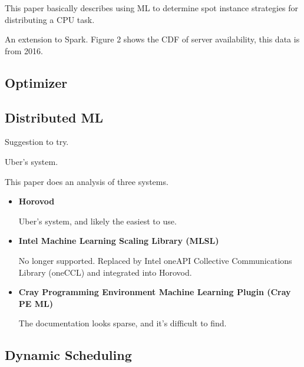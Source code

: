 
This paper basically describes using ML to determine spot instance strategies
for distributing a CPU task.


An extension to Spark.
Figure 2 shows the CDF of server availability, this data is from 2016.

\subsection{Optimizer}


\noindent \tagoptimizer{}


\subsection{Distributed ML}


Suggestion to try.


Uber's system.



This paper does an analysis of three systems.

\begin{itemize}
  \item \textbf{Horovod}

    Uber's system, and likely the easiest to use.
  \item \textbf{Intel Machine Learning Scaling Library (MLSL)}

    No longer supported. Replaced by Intel oneAPI Collective Communications
    Library (oneCCL) and integrated into Horovod.
  \item \textbf{Cray Programming Environment Machine Learning Plugin (Cray PE
    ML)}

    The documentation looks sparse, and it's difficult to find.
\end{itemize}


\subsection{Dynamic Scheduling}


